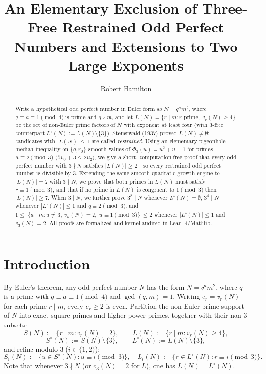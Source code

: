 \documentclass[11pt]{amsart}
\title[Exclusion of Three-Free Restrained Odd Perfect Numbers]{An Elementary Exclusion of Three-Free Restrained Odd Perfect Numbers and Extensions to Two Large Exponents}
\author{Robert Hamilton}
\theoremstyle{definition}
\theoremstyle{remark}
\begin{document}
\begin{abstract}
Write a hypothetical odd perfect number in Euler form as $N = q^a m^2$, where $q \equiv a \equiv 1 \pmod 4$ is prime and $q \nmid m$, and let $L(N) = \{r \mid m : r \text{ prime},\; v_r(N) \ge 4\}$ be the set of non-Euler prime factors of $N$ with exponent at least four (with $3$-free counterpart $L^\circ(N) := L(N) \setminus \{3\}$). Steuerwald (1937) proved $L(N) \ne \emptyset$; candidates with $|L(N)| \le 1$ are called \emph{restrained}. Using an elementary pigeonhole-median inequality on $\{q, r_0\}$-smooth values of $\Phi_3(u) = u^2 + u + 1$ for primes $u \equiv 2 \pmod 3$ ($5 u_0 + 3 \le 2 u_2$), we give a short, computation-free proof that every odd perfect number with $3 \nmid N$ satisfies $|L(N)| \ge 2$---so every restrained odd perfect number is divisible by $3$. Extending the same smooth-quadratic growth engine to $|L(N)| = 2$ with $3 \nmid N$, we prove that both primes in $L(N)$ must satisfy $r \equiv 1 \pmod 3$, and that if no prime in $L(N)$ is congruent to $1 \pmod 3$ then $|L(N)| \ge 7$. When $3 \mid N$, we further prove $3^8 \mid N$ whenever $L^\circ(N) = \emptyset$, $3^4 \mid N$ whenever $|L^\circ(N)| \le 1$ and $q \equiv 2 \pmod 3$, and $1 \le |\{u \mid m : u \ne 3,\; v_u(N) = 2,\; u \equiv 1 \pmod 3\}| \le 2$ whenever $|L^\circ(N)| \le 1$ and $v_3(N) = 2$. All proofs are formalized and kernel-audited in Lean~4/Mathlib.
\end{abstract}

\maketitle

\section{Introduction}

By Euler's theorem, any odd perfect number $N$ has the form $N = q^a m^2$, where $q$ is a prime with $q \equiv a \equiv 1 \pmod 4$ and $\gcd(q, m) = 1$. Writing $e_r = v_r(N)$ for each prime $r \mid m$, every $e_r \ge 2$ is even. Partition the non-Euler prime support of $N$ into exact-square primes and higher-power primes, together with their non-$3$ subsets:
\[
  S(N) := \{r \mid m : v_r(N) = 2\}, \qquad L(N) := \{r \mid m : v_r(N) \ge 4\},
\]
\[
  S^\circ(N) := S(N) \setminus \{3\}, \qquad L^\circ(N) := L(N) \setminus \{3\},
\]
and refine modulo $3$ ($i \in \{1, 2\}$):
\[
  S_i(N) := \{u \in S^\circ(N) : u \equiv i \pmod 3\}, \quad L_i(N) := \{r \in L^\circ(N) : r \equiv i \pmod 3\}.
\]
Note that whenever $3 \nmid N$ (or $v_3(N) = 2$ for $L$), one has $L(N) = L^\circ(N)$.
\end{document}
